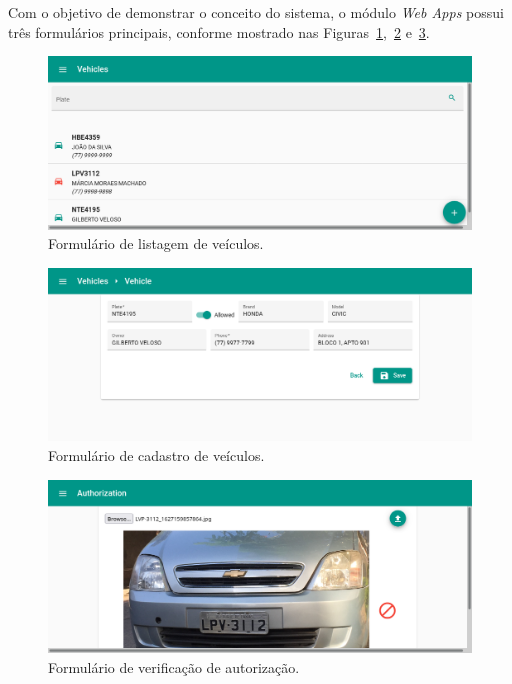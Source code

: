 \documentclass[12pt]{article}
\begin{document}
Com o objetivo de demonstrar o conceito do sistema, o módulo \textit{Web Apps} possui três formulários principais, conforme mostrado nas Figuras~\ref{fig:form01},~\ref{fig:form02} e~\ref{fig:form03}.

\begin{figure}[ht]
	\centering
	\includegraphics[width=1\textwidth]{form01.png}
	\caption{Formulário de listagem de veículos.}
	\label{fig:form01}
\end{figure}

\begin{figure}[ht]
	\centering
	\includegraphics[width=1\textwidth]{form02.png}
	\caption{Formulário de cadastro de veículos.}
	\label{fig:form02}
\end{figure}

\begin{figure}[ht]
	\centering
	\includegraphics[width=1\textwidth]{form03.png}
	\caption{Formulário de verificação de autorização.}
	\label{fig:form03}
\end{figure}
\end{document}
